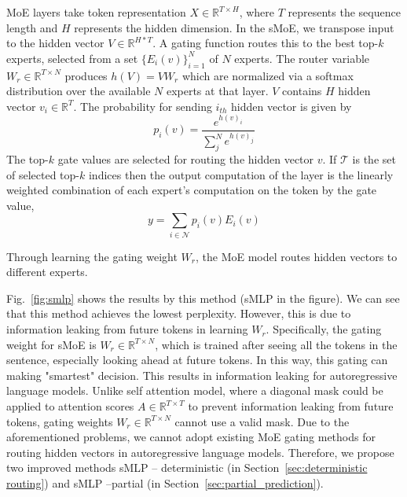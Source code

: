 \documentclass{article}
\begin{document}
MoE layers take token representation $X \in \mathbb{R}^{T \times H}$, where $T$ represents the sequence length and $H$ represents the hidden dimension. In the sMoE, we transpose input to the hidden vector $V \in \mathbb{R}^{H*T}$. A gating function routes this to the best top-$k$ experts, selected from a set $\{E_i(v)\}_{i=1}^N$ of $N$ experts. The router variable $W_r \in \mathbb{R}^{T \times N}$ produces $h(V) = V W_r$ which are normalized via a softmax distribution over the available $N$ experts at that layer. $V$ contains $H$ hidden vector $v_i\in \mathbb{R}^{T}$. The probability for sending $i_{th}$ hidden vector is given by
\begin{equation}
    p_i(v) = \frac{e^{h(v)_i}}{\sum_j^N e^{h(v)_j}}
\label{eq:smoe_gating}
\end{equation}
The top-$k$ gate values are selected for routing the hidden vector $v$. If $\mathcal{T}$ is the set of selected top-$k$ indices then the output computation of the layer is the linearly weighted combination of each expert's computation on the token by the gate value,
\begin{equation}
    y = \sum_{i \in \mathcal{N}} p_i(v) E_i(v) 
\end{equation}

Through learning the gating weight $W_r$, the MoE model routes hidden vectors to different experts. 

Fig.~\ref{fig:smlp} shows the results by this method (sMLP in the figure). We can see that this method achieves the lowest perplexity. However, this is due to information leaking from future tokens in learning $W_r$. Specifically, the gating weight for sMoE is $W_r \in \mathbb{R}^{T\times N}$, which is trained after seeing all the tokens in the sentence, especially looking ahead at future tokens. In this way, this gating can making "smartest" decision.
This results in information leaking for autoregressive language models. Unlike self attention model, where a diagonal mask could be applied to attention scores $A \in \mathbb{R}^{T\times T}$  to prevent information leaking from future tokens, gating weights $W_r \in \mathbb{R}^{T\times N}$ cannot use a valid mask. Due to the aforementioned problems, we cannot adopt existing MoE gating methods for routing hidden vectors in autoregressive language models. Therefore, we propose two improved methods sMLP -- deterministic (in Section~\ref{sec:deterministic routing}) and sMLP --partial (in Section~\ref{sec:partial_prediction}).
\end{document}
